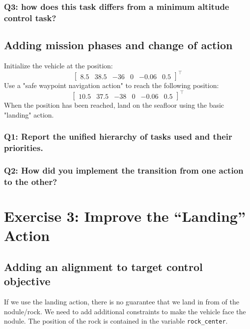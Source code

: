 \documentclass{article}
\begin{document}
\subsubsection{Q3: how does this task differs from a minimum altitude control task?}

\subsection{Adding mission phases and change of action}
Initialize the vehicle at the position:
\begin{displaymath}
\begin{bmatrix} 8.5 & 38.5 & -36 & 0 & -0.06 & 0.5 \end{bmatrix}^\top
\end{displaymath}
Use a "safe waypoint navigation action" to reach the following position:
\begin{displaymath}
\begin{bmatrix} 10.5 & 37.5 & -38 & 0 & -0.06 & 0.5 \end{bmatrix}^\top
\end{displaymath}
When the position has been reached, land on the seafloor using the basic "landing" action.

\subsubsection{Q1: Report the unified hierarchy of tasks used and their priorities.}

\subsubsection{Q2: How did you implement the transition from one action to the other?}

\clearpage

\section{Exercise 3: Improve the “Landing” Action}
\subsection{Adding an alignment to target control objective}
If we use the landing action, there is no guarantee that we land in from of the nodule/rock. We need to add additional constraints to make the vehicle face the nodule. The position of the rock is contained in the variable \texttt{rock\_center}.
\end{document}
